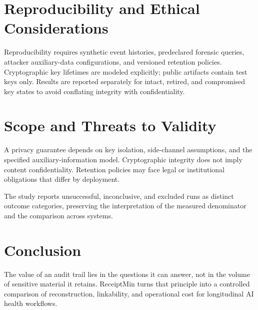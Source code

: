 \documentclass[11pt,a4paper]{article}
\begin{document}
\section{Reproducibility and Ethical Considerations}
Reproducibility requires synthetic event histories, predeclared forensic queries, attacker auxiliary-data configurations, and versioned retention policies. Cryptographic key lifetimes are modeled explicitly; public artifacts contain test keys only. Results are reported separately for intact, retired, and compromised key states to avoid conflating integrity with confidentiality.

\section{Scope and Threats to Validity}
A privacy guarantee depends on key isolation, side-channel assumptions, and the specified auxiliary-information model. Cryptographic integrity does not imply content confidentiality. Retention policies may face legal or institutional obligations that differ by deployment.

The study reports unsuccessful, inconclusive, and excluded runs as distinct outcome categories, preserving the interpretation of the measured denominator and the comparison across systems.

\section{Conclusion}
The value of an audit trail lies in the questions it can answer, not in the volume of sensitive material it retains. ReceiptMin turns that principle into a controlled comparison of reconstruction, linkability, and operational cost for longitudinal AI health workflows.



\end{document}
